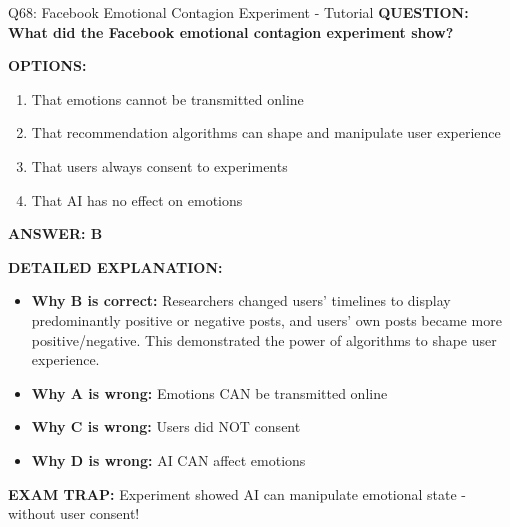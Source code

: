 \documentclass[8pt]{beamer}
\begin{document}
	\begin{frame}{Q68: Facebook Emotional Contagion Experiment - Tutorial}
		\fontsize{6.5}{7.5}\selectfont
		\textbf{QUESTION: What did the Facebook emotional contagion experiment show?}
		
		\vspace{0.1cm}
		\textbf{OPTIONS:}
		\begin{enumerate}
			\item That emotions cannot be transmitted online
			\item That recommendation algorithms can shape and manipulate user experience
			\item That users always consent to experiments
			\item That AI has no effect on emotions
		\end{enumerate}
		
		\vspace{0.1cm}
		\textcolor{myblue}{\textbf{ANSWER: B}}
		
		\vspace{0.1cm}
		\textbf{DETAILED EXPLANATION:}
		\begin{itemize}
			\item \textbf{Why B is correct:} Researchers changed users' timelines to display predominantly positive or negative posts, and users' own posts became more positive/negative. This demonstrated the power of algorithms to shape user experience.
			\item \textbf{Why A is wrong:} Emotions CAN be transmitted online
			\item \textbf{Why C is wrong:} Users did NOT consent
			\item \textbf{Why D is wrong:} AI CAN affect emotions
		\end{itemize}
		
		\textcolor{myred}{\textbf{EXAM TRAP:}} Experiment showed \textcolor{myblue}{AI can manipulate emotional state} - without user consent!
	\end{frame}
	
\end{document}
